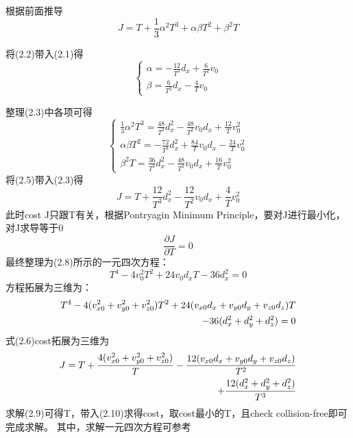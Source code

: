 \documentclass[40pt,a4paper,UTF8]{ctexart}
\numberwithin{equation}{section}
\begin{document}
根据前面推导
\begin{equation}
    J = T+\frac{1}{3}\alpha^2T^3+\alpha\beta T^2 + \beta^2T
\end{equation}

将(2.2)带入(2.1)得
\begin{equation}
    \left\{
        \begin{array}{l}
            \alpha = -\frac{12}{T^3}d_x +\frac{6}{T^2}v_0\\
            \beta = \frac{6}{T^2}d_x -\frac{4}{T}v_0
        \end{array}
    \right.
\end{equation}

整理(2.3)中各项可得
\begin{equation}
    \left\{
        \begin{array}{l}
            \frac{1}{3}\alpha^2T^3 = \frac{48}{T^3}d_x^2 -\frac{48}{T^2}v_0 d_x +\frac{12}{T}v_0^2\\
            \alpha\beta T^2 = -\frac{72}{T^3}d_x^2 +\frac{84}{T}v_0d_x-\frac{24}{T}v_0^2\\
            \beta^2 T=\frac{36}{T^3}d_x^2 -\frac{48}{T^2}v_0d_x+\frac{16}{T}v_0^2
        \end{array}
    \right.
\end{equation}
将(2.5)带入(2.3)得
\begin{equation}
    J=T + \frac{12}{T^3}d_x^2 - \frac{12}{T^2}v_0d_x+\frac{4}{T}v_0^2
\end{equation}
此时cost J只跟T有关，根据Pontryagin Minimum Principle，要对J进行最小化，对J求导等于0
\begin{equation}
    \frac{\partial J}{\partial T} = 0
\end{equation}
最终整理为(2.8)所示的一元四次方程：
\begin{equation}
    T^4-4v_0^2T^2+24v_0d_xT-36d_x^2=0
\end{equation}
方程拓展为三维为：
\begin{align}
    T^4-4(v_{x0}^2+v_{y0}^2+v_{z0}^2)T^2+24(v_{x0}d_x+v_{y0}d_y+v_{z0}d_z)T \notag \\
    -36(d_x^2+d_y^2+d_z^2)=0
\end{align}
式(2.6)cost拓展为三维为
\begin{align}
    J=T + \frac{4(v_{x0}^2+v_{y0}^2+v_{z0}^2)}{T} -
     \frac{12(v_{x0}d_x+v_{y0}d_y+v_{z0}d_z)}{T^2}\notag \\
     +\frac{12(d_x^2+d_y^2+d_z^2)}{T^3}
\end{align}
求解(2.9)可得T，带入(2.10)求得cost，取cost最小的T，且check collision-free即可完成求解。
其中，求解一元四次方程可参考\cite{ref3}
\end{document}
